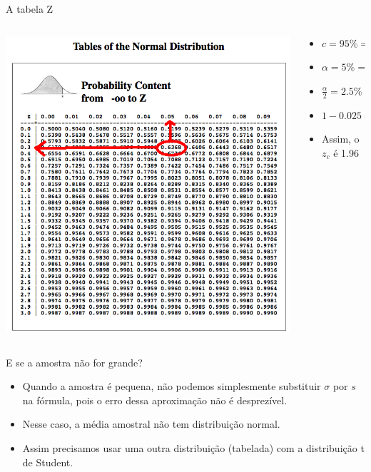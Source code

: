 \documentclass{beamer}
\begin{document}
\begin{frame}{A tabela Z}
  \begin{columns}
    \begin{column}{7cm}
    \includegraphics[height=0.9\textheight]{Inf_II/z_table}
    \end{column}
    \begin{column}{5cm}
      \begin{itemize}
      \item $c=95\% = 0.95$
      \item $\alpha = 5\% = 0.05$

      \item $\frac{\alpha}{2} = 2.5\% = 0.0250$

      \item $1-0.025 = 0.9750$%

      \item Assim, o $z_c$ é 1.96

      \end{itemize}
    \end{column}
  \end{columns}
\end{frame}

\begin{frame}{E se a amostra não for grande?}
  \begin{itemize}
  \item Quando a amostra é pequena, não podemos simplesmente
    substituir $\sigma$ por $s$ na fórmula, pois o erro dessa
    aproximação não é desprezível.
  \item Nesse caso, a média amostral não tem distribuição normal.
  \item Assim precisamos usar uma outra distribuição (tabelada) com a
    distribuição \alert{t de Student}.
  \end{itemize}
\end{frame}
\end{document}
